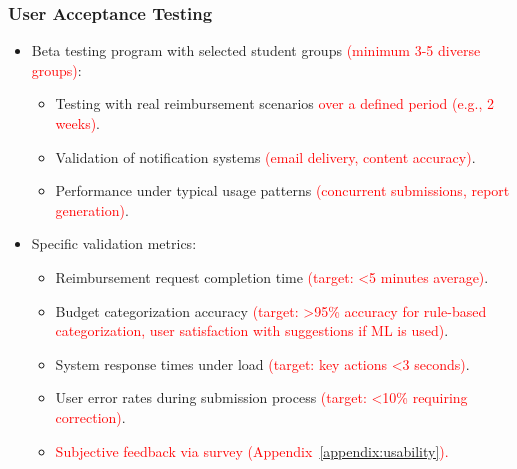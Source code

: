 \documentclass[12pt, titlepage]{article}
\begin{document}
\subsubsection*{User Acceptance Testing}
\begin{itemize}
   \item Beta testing program with selected student groups \textcolor{red}{(minimum 3-5 diverse groups)}:
   \begin{itemize}
       \item Testing with real reimbursement scenarios \textcolor{red}{over a defined period (e.g., 2 weeks)}.
       \item Validation of notification systems \textcolor{red}{(email delivery, content accuracy)}.
       \item Performance under typical usage patterns \textcolor{red}{(concurrent submissions, report generation)}.
   \end{itemize}
   \item Specific validation metrics:
   \begin{itemize}
       \item Reimbursement request completion time \textcolor{red}{(target: \textless 5 minutes average)}.
       \item Budget categorization accuracy \textcolor{red}{(target: \textgreater 95\% accuracy for rule-based categorization, user satisfaction with suggestions if ML is used)}.
       \item System response times under load \textcolor{red}{(target: key actions \textless 3 seconds)}.
       \item User error rates during submission process \textcolor{red}{(target: \textless 10\% requiring correction)}.
       \item \textcolor{red}{Subjective feedback via survey (Appendix~\ref{appendix:usability}).} 
   \end{itemize}
\end{itemize}
\end{document}
